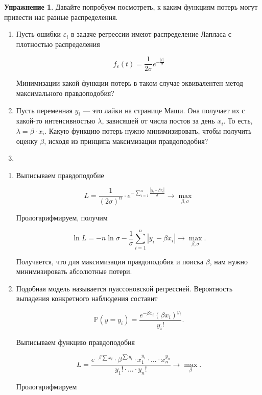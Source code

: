 \documentclass[12pt, a4paper, oneside]{extreport}
\def \e{\varepsilon}
\def \mbb{\mathbb}
\def \PP{\mbb{P}}
\theoremstyle{plain}              %
\theoremstyle{definition}         %
\newtheorem{problem}{\color{myblue} Упражнение}
\begin{document}
\begin{problem}\label{log_reg}
	Давайте попробуем посмотреть, к каким функциям потерь могут привести нас разные распределения. 
	\begin{enumerate}
		\item Пусть ошибки $\e_i$ в задаче регрессии имеют распределение Лапласа с плотностью распределения 
		
		\[f_{\e}(t) = \frac{1}{2 \sigma} e^{-\frac{|t|}{\sigma}} \] 
		
		Минимизации какой функции потерь в таком случае эквивалентен метод максимального правдоподобия? 
		
		\item Пусть переменная $y_i$ --- это лайки на странице Маши. Она получает их с какой-то интенсивностью $\lambda$, зависящей от числа постов за день $x_i$. То есть, $\lambda = \beta \cdot x_i$. Какую функцию потерь нужно минимизировать, чтобы получить оценку $\beta$, исходя из принципа максимизации правдоподобия? 
		
		\item {}

	\end{enumerate}
	\begin{sol}
	\begin{enumerate}		
		\item Выписываем правдоподобие
		
		\[ L = \frac{1}{(2 \sigma)^n} \cdot e^{- \sum_{i=1}^n \frac{|y_i - \beta x_i|}{\sigma}} \to \max_{\beta, \sigma} \] 
		
		Прологарифмируем, получим 
		
		\[ \ln L = - n \ln \sigma - \frac{1}{\sigma} \sum_{i=1}^n |y_i - \beta x_i| \to \max_{\beta, \sigma}.\]
		
		Получается, что для максимизации правдоподобия и поиска $\beta$, нам нужно минимизировать абсолютные потери. 
		
		\item  Подобная модель называется пуассоновской регрессией.  Вероятность выпадения конкретного наблюдения составит 
		
		\[ \PP(y = y_i) = \frac{e^{-\beta x_i} (\beta x_i)^{y_i}}{y_i!}.\]
		
		Выписываем функцию правдоподобия 
		
		\[ L = \frac{e^{-\beta \sum x_i} \cdot \beta^{\sum y_i} \cdot x_1^{y_1} \cdot \ldots \cdot x_n^{y_n}}{y_1! \cdot \ldots \cdot y_n!} \to \max_{\beta}. \]
		
		Прологарифмируем
		

\end{enumerate}
\end{sol}
\end{problem}
\end{document}
